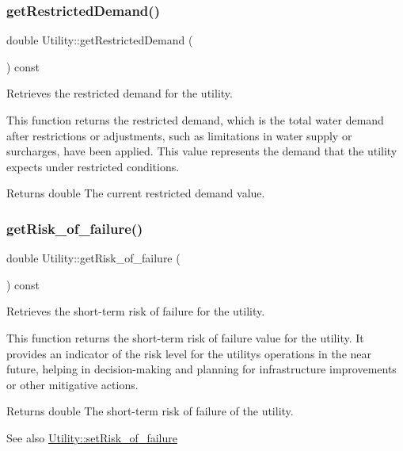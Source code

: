 \subsubsection{\texorpdfstring{get\+Restricted\+Demand()}{getRestrictedDemand()}}
{\footnotesize\ttfamily double Utility\+::get\+Restricted\+Demand (\begin{DoxyParamCaption}{ }\end{DoxyParamCaption}) const}



Retrieves the restricted demand for the utility. 

This function returns the restricted demand, which is the total water demand after restrictions or adjustments, such as limitations in water supply or surcharges, have been applied. This value represents the demand that the utility expects under restricted conditions.

\begin{DoxyReturn}{Returns}
double The current restricted demand value. 
\end{DoxyReturn}
\mbox{\label{classUtility_ab43bfbf7db1b5dc2e554a584b19f9e3c}} 
\subsubsection{\texorpdfstring{get\+Risk\+\_\+of\+\_\+failure()}{getRisk\_of\_failure()}}
{\footnotesize\ttfamily double Utility\+::get\+Risk\+\_\+of\+\_\+failure (\begin{DoxyParamCaption}{ }\end{DoxyParamCaption}) const}



Retrieves the short-\/term risk of failure for the utility. 

This function returns the short-\/term risk of failure value for the utility. It provides an indicator of the risk level for the utility\textquotesingle{}s operations in the near future, helping in decision-\/making and planning for infrastructure improvements or other mitigative actions.

\begin{DoxyReturn}{Returns}
double The short-\/term risk of failure of the utility.
\end{DoxyReturn}
\begin{DoxySeeAlso}{See also}
\mbox{\hyperlink{classUtility_a68d5088951f6bdccbb7af18ea8f153f5}{Utility\+::set\+Risk\+\_\+of\+\_\+failure}} 
\end{DoxySeeAlso}
\mbox{\label{classUtility_a446e46d3dac749121db6cb839acf28dd}} 
